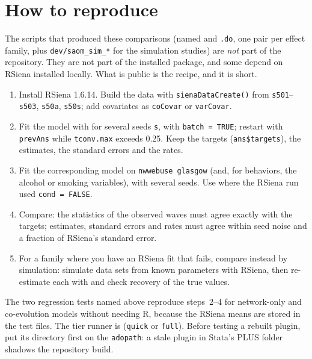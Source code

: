 \section{How to reproduce}
The scripts that produced these comparisons (named  and \texttt{.do}, one pair per effect family, plus \texttt{dev/saom\_sim\_*} for the simulation studies) are \emph{not} part of the repository. They are not part of the installed package, and some depend on RSiena installed locally. What is public is the recipe, and it is short.
\begin{enumerate}
\item Install RSiena 1.6.14. Build the data with \texttt{sienaDataCreate()} from \texttt{s501}--\texttt{s503}, \texttt{s50a}, \texttt{s50s}; add covariates as \texttt{coCovar} or \texttt{varCovar}.
\item Fit the model with  for several seeds \texttt{s}, with \texttt{batch = TRUE}; restart with \texttt{prevAns} while \texttt{tconv.max} exceeds 0.25. Keep the targets (\texttt{ans\$targets}), the estimates, the standard errors and the rates.
\item Fit the corresponding \nwsaom{} model on \texttt{nwwebuse glasgow} (and, for behaviors, the alcohol or smoking variables), with several seeds. Use  where the RSiena run used \texttt{cond = FALSE}.
\item Compare: the statistics of the observed waves must agree exactly with the targets; estimates, standard errors and rates must agree within seed noise and a fraction of RSiena's standard error.
\item For a family where you have an RSiena fit that fails, compare instead by simulation: simulate data sets from known parameters with RSiena, then re-estimate each with \nwsaom{} and check recovery of the true values.
\end{enumerate}
The two regression tests named above reproduce steps~2--4 for network-only and co-evolution models without needing R, because the RSiena means are stored in the test files. The tier runner is  (\texttt{quick} or \texttt{full}). Before testing a rebuilt plugin, put its directory first on the \texttt{adopath}: a stale plugin in Stata's PLUS folder shadows the repository build.
